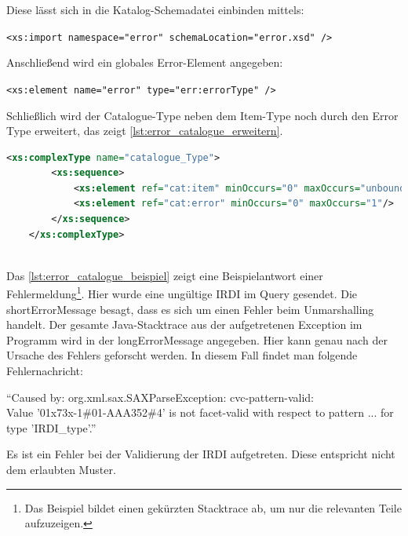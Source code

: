Diese lässt sich in die Katalog-Schemadatei einbinden mittels:

\lstinline[basicstyle=\ttfamily\small\mdseries]{<xs:import namespace="error" schemaLocation="error.xsd" /> }

Anschließend wird ein globales Error-Element angegeben:

\lstinline[basicstyle=\ttfamily\small\mdseries]{<xs:element name="error" type="err:errorType" />}

Schließlich wird der Catalogue-Type neben dem Item-Type noch durch den Error Type erweitert, das zeigt \autoref{lst:error_catalogue_erweitern}.

 \begin{lstlisting}[caption=Fehlerbehandlung - Catalogue Type erweitern, language=xml, label=lst:error_catalogue_erweitern]
	<xs:complexType name="catalogue_Type">
		<xs:sequence>
			<xs:element ref="cat:item" minOccurs="0" maxOccurs="unbounded"/>
			<xs:element ref="cat:error" minOccurs="0" maxOccurs="1"/>
		</xs:sequence>
	</xs:complexType> 
	
\end{lstlisting} 

Das \autoref{lst:error_catalogue_beispiel} zeigt eine Beispielantwort einer Fehlermeldung\footnote{Das Beispiel bildet einen gekürzten Stacktrace ab, um nur die relevanten Teile aufzuzeigen.}. Hier wurde eine ungültige IRDI im Query gesendet. Die shortErrorMessage besagt, dass es sich um einen Fehler beim Unmarshalling handelt. Der gesamte Java-Stacktrace aus der aufgetretenen Exception im Programm wird in der longErrorMessage angegeben. Hier kann genau nach der Ursache des Fehlers geforscht werden. In diesem Fall findet man folgende Fehlernachricht:

\enquote{Caused by: org.xml.sax.SAXParseException: cvc-pattern-valid: \\ 
Value '01x73x-1\#01-AAA352\#4' is not facet-valid with respect to pattern ... for type 'IRDI\_type'.}

Es ist ein Fehler bei der Validierung der IRDI aufgetreten. Diese entspricht nicht dem erlaubten Muster.

